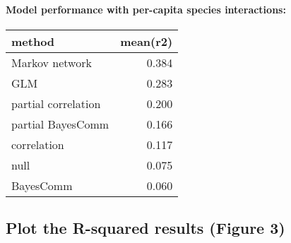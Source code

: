 \documentclass[11pt,]{article}
\newenvironment{Shaded}{\begin{snugshade}}{\end{snugshade}}
\newcommand{\KeywordTok}[1]{\textcolor[rgb]{0.13,0.29,0.53}{\textbf{{#1}}}}
\newcommand{\DataTypeTok}[1]{\textcolor[rgb]{0.13,0.29,0.53}{{#1}}}
\newcommand{\DecValTok}[1]{\textcolor[rgb]{0.00,0.00,0.81}{{#1}}}
\newcommand{\StringTok}[1]{\textcolor[rgb]{0.31,0.60,0.02}{{#1}}}
\newcommand{\NormalTok}[1]{{#1}}
\let\oldparagraph\paragraph
\renewcommand{\paragraph}[1]{\oldparagraph{#1}\mbox{}}
\begin{document}
\paragraph{Model performance with per-capita species
interactions:}\label{model-performance-with-per-capita-species-interactions}

\begin{Shaded}
\end{Shaded}

\begin{longtable}[c]{@{}lr@{}}
\toprule
method & mean(r2)\tabularnewline
\midrule
\endhead
Markov network & 0.384\tabularnewline
GLM & 0.283\tabularnewline
partial correlation & 0.200\tabularnewline
partial BayesComm & 0.166\tabularnewline
correlation & 0.117\tabularnewline
null & 0.075\tabularnewline
BayesComm & 0.060\tabularnewline
\bottomrule
\end{longtable}

\subsection{Plot the R-squared results (Figure
3)}\label{plot-the-r-squared-results-figure-3}
\end{document}
